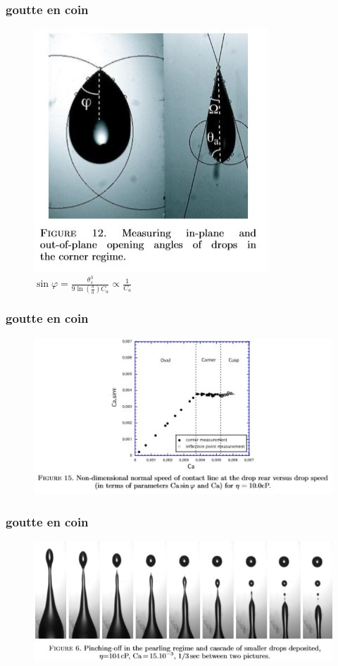 \documentclass{beamer}
\begin{document}
\begin{frame}
 \frametitle{goutte en coin}
\begin{figure}[t]
\centering
\includegraphics[scale = 0.5]{Coin.jpg}
	\caption{$\sin \varphi = \frac{\theta_{s}^{3}}{9\ln\left( \frac{b}{a} \right) C_{a}} \propto \frac{1}{C_{a}}$}
\end{figure}
\end{frame}

\begin{frame}
 \frametitle{goutte en coin}
\begin{figure}[t]
\centering
\includegraphics[scale = 0.5]{sinvarphi.jpg}
\end{figure}
\end{frame}


\begin{frame}
 \frametitle{goutte en coin}
\begin{figure}[t]
\includegraphics[scale = 0.5]{goutellette.jpg}
\centering

\end{figure}
\end{frame}
\end{document}
